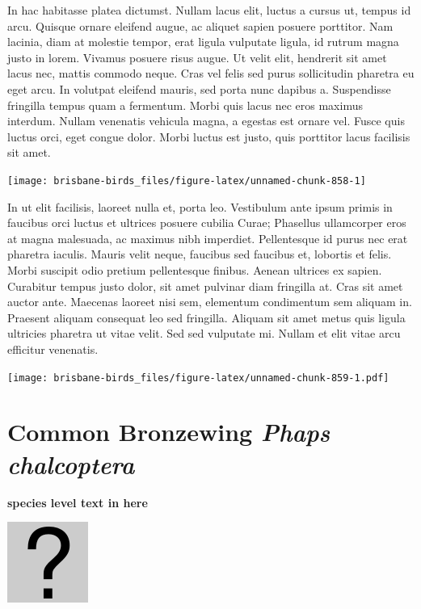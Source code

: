 \documentclass[]{book}
\let\origfigure\figure
\let\endorigfigure\endfigure
\renewenvironment{figure}[1][2] {
  \expandafter\origfigure\expandafter[H]
} {
  \endorigfigure
}
\begin{document}
In hac habitasse platea dictumst. Nullam lacus elit, luctus a cursus ut,
tempus id arcu. Quisque ornare eleifend augue, ac aliquet sapien posuere
porttitor. Nam lacinia, diam at molestie tempor, erat ligula vulputate
ligula, id rutrum magna justo in lorem. Vivamus posuere risus augue. Ut
velit elit, hendrerit sit amet lacus nec, mattis commodo neque. Cras vel
felis sed purus sollicitudin pharetra eu eget arcu. In volutpat eleifend
mauris, sed porta nunc dapibus a. Suspendisse fringilla tempus quam a
fermentum. Morbi quis lacus nec eros maximus interdum. Nullam venenatis
vehicula magna, a egestas est ornare vel. Fusce quis luctus orci, eget
congue dolor. Morbi luctus est justo, quis porttitor lacus facilisis sit
amet.

\begin{figure}
\texttt{[image: brisbane-birds\_files/figure-latex/unnamed-chunk-858-1]} \caption{insert figure caption}\label{fig:unnamed-chunk-858}
\end{figure}

In ut elit facilisis, laoreet nulla et, porta leo. Vestibulum ante ipsum
primis in faucibus orci luctus et ultrices posuere cubilia Curae;
Phasellus ullamcorper eros at magna malesuada, ac maximus nibh
imperdiet. Pellentesque id purus nec erat pharetra iaculis. Mauris velit
neque, faucibus sed faucibus et, lobortis et felis. Morbi suscipit odio
pretium pellentesque finibus. Aenean ultrices ex sapien. Curabitur
tempus justo dolor, sit amet pulvinar diam fringilla at. Cras sit amet
auctor ante. Maecenas laoreet nisi sem, elementum condimentum sem
aliquam in. Praesent aliquam consequat leo sed fringilla. Aliquam sit
amet metus quis ligula ultricies pharetra ut vitae velit. Sed sed
vulputate mi. Nullam et elit vitae arcu efficitur venenatis.

\begin{figure}
\centering
\texttt{[image: brisbane-birds\_files/figure-latex/unnamed-chunk-859-1.pdf]}
\caption{\label{fig:unnamed-chunk-859}insert figure caption}
\end{figure}

\section{\texorpdfstring{Common Bronzewing \emph{Phaps
chalcoptera}}{Common Bronzewing Phaps chalcoptera}}\label{common-bronzewing-phaps-chalcoptera}

\textbf{species level text in here}

\begin{figure}
\centering
\includegraphics{assets/missing.png}
\caption{No image for species}
\end{figure}
\end{document}
